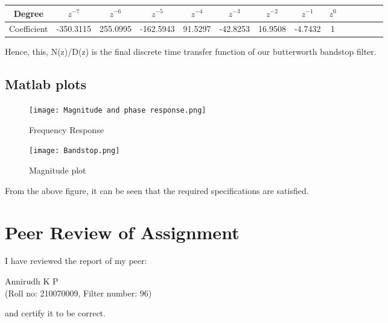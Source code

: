 \documentclass{article}
\begin{document}
\begin{table}[H]
		\begin{center}
		\begin{tabular}{|c|c|c|c|c|c|c|c|c|c|c|c|c|c|}
			\hline
			Degree &  $z^{-7}$ & $z^{-6}$  & $z^{-5}$ & $z^{-4}$ & $z^{-3}$ & $z^{-2}$ & $z^{-1}$ & $z^0$ \\
			
			\hline
                Coefficient & -350.3115 & 255.0995 & -162.5943 & 91.5297 & -42.8253 & 16.9508 & -4.7432 & 1 \\
                \hline
            
		\end{tabular}
		\end{center}
\end{table}

Hence, this, N(z)/D(z) is the final discrete time transfer function of our butterworth bandstop filter.

\subsection{Matlab plots}

\begin{figure}[h!]

\centering
\texttt{[image: Magnitude and phase response.png]}
\caption{Frequency Response}
\end{figure}
\clearpage
\begin{figure}[h!]

\centering
\texttt{[image: Bandstop.png]}
\caption{Magnitude plot}
\end{figure}

From the above figure, it can be seen that the required specifications are satisfied.

\section{Peer Review of Assignment}

I have reviewed the report of my peer:

\begin{center}
    Annirudh K P\\
    (Roll no: 210070009, Filter number: 96)
\end{center}
and certify it to be correct.
\end{document}
